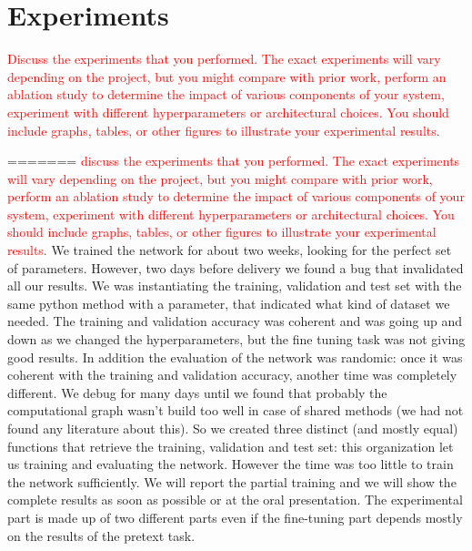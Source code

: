 \section{Experiments}
\textcolor{red}{Discuss the experiments that you performed. The exact experiments will vary depending on the project, but you might compare with prior work, perform an ablation study to determine the impact of various components of your system, experiment with different hyperparameters or architectural choices. You should include graphs, tables, or other figures to illustrate your experimental results.}

=======
\textcolor{red}{discuss the experiments that you performed. The exact experiments will vary depending on the project, but you might compare with prior work, perform an ablation study to determine the impact of various components of your system, experiment with different hyperparameters or architectural choices. You should include graphs, tables, or other figures to illustrate your experimental results.}
We trained the network for about two weeks, looking for the perfect set of parameters. However, two days before delivery we found a bug that invalidated all our results. We was instantiating the training, validation and test set with the same python method with a parameter, that indicated what kind of dataset we needed. The training and validation accuracy was coherent and was going up and down as we changed the hyperparameters, but the fine tuning task was not giving good results. In addition the evaluation of the network was randomic: once it was coherent with the training and validation accuracy, another time was completely different. We debug for many days until we found that probably the computational graph wasn't build too well in case of shared methods (we had not found any literature about this). So we created three distinct (and mostly equal) functions that retrieve the training, validation and test set: this organization let us training and evaluating the network. However the time was too little to train the network sufficiently. We will report the partial training and we will show the complete results as soon as possible or at the oral presentation.\newline
The experimental part is made up of two different parts even if the fine-tuning part depends mostly on the results of the pretext task. 


